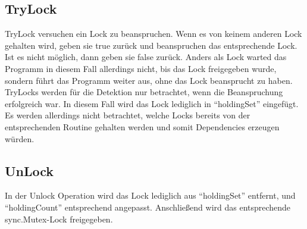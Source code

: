 \subsection{TryLock}\label{Chap::Implementation:Logging.TryLock}
TryLock versuchen ein Lock zu beanspruchen. Wenn es von keinem anderen Lock 
gehalten wird, geben sie true zurück und beanspruchen das entsprechende Lock. 
Ist es nicht möglich, dann geben sie false zurück. Anders als Lock warted das 
Programm in diesem Fall allerdings nicht, bis das Lock freigegeben wurde, sondern
führt das Programm weiter aus, ohne das Lock beansprucht zu haben.\\ 
TryLocks werden für die Detektion nur betrachtet, wenn die Beanspruchung 
erfolgreich war. In diesem Fall wird das Lock lediglich in ``holdingSet'' 
eingefügt.
Es werden allerdings nicht betrachtet, welche Locks bereits von der 
entsprechenden Routine gehalten werden und somit Dependencies erzeugen 
würden.

\subsection{UnLock}\label{Chap::Implementation:Logging.UnLock}
In der Unlock Operation wird das Lock lediglich aus ``holdingSet'' entfernt,
und ``holdingCount'' entsprechend angepasst. Anschließend wird das entsprechende
sync.Mutex-Lock freigegeben.


